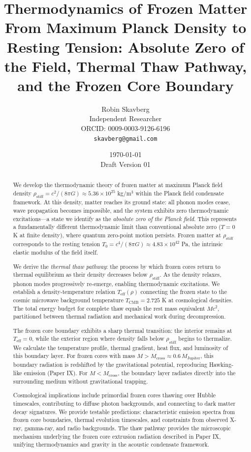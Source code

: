 \documentclass[11pt,a4paper]{article}
\title{\textbf{Thermodynamics of Frozen Matter}\\[0.5em]
\large From Maximum Planck Density to Resting Tension: Absolute Zero of the Field, Thermal Thaw Pathway, and the Frozen Core Boundary}
\author{Robin Skavberg\\[0.3em]
\small Independent Researcher\\
\small ORCID: 0009-0003-9126-6196\\
\small \texttt{skavberg@gmail.com}}
\date{\today\\[0.5em]
\small Draft Version 01}
\newcommand{\rhostiff}{\ensuremath{\rho_{\mathrm{stiff}}}}
\newcommand{\Tzero}{\ensuremath{T_0}}
\newcommand{\Teff}{\ensuremath{T_{\mathrm{eff}}}}
\newcommand{\TCMB}{\ensuremath{T_{\mathrm{CMB}}}}
\newcommand{\Mcross}{\ensuremath{M_{\mathrm{cross}}}}
\theoremstyle{definition}
\theoremstyle{remark}
\begin{document}
\maketitle

\begin{abstract}
We develop the thermodynamic theory of frozen matter at maximum Planck field density $\rhostiff = c^2/(8\pi G) \approx 5.36 \times 10^{25}$ kg/m$^3$ within the Planck field condensate framework. At this density, matter reaches its ground state: all phonon modes cease, wave propagation becomes impossible, and the system exhibits zero thermodynamic excitations---a state we identify as the \emph{absolute zero of the Planck field}. This represents a fundamentally different thermodynamic limit than conventional absolute zero ($T = 0$ K at finite density), where quantum zero-point motion persists. Frozen matter at $\rhostiff$ corresponds to the resting tension $\Tzero = c^4/(8\pi G) \approx 4.83 \times 10^{42}$ Pa, the intrinsic elastic modulus of the field itself.

\vspace{0.5em}
\noindent
We derive the \emph{thermal thaw pathway}: the process by which frozen cores return to thermal equilibrium as their density decreases below $\rhostiff$. As the density relaxes, phonon modes progressively re-emerge, enabling thermodynamic excitations. We establish a density-temperature relation $\Teff(\rho)$ connecting the frozen state to the cosmic microwave background temperature $\TCMB = 2.725$ K at cosmological densities. The total energy budget for complete thaw equals the rest mass equivalent $Mc^2$, partitioned between thermal radiation and mechanical work during decompression.

\vspace{0.5em}
\noindent
The frozen core boundary exhibits a sharp thermal transition: the interior remains at $\Teff = 0$, while the exterior region where density falls below $\rhostiff$ begins to thermalize. We calculate the temperature profile, thermal gradient, heat flux, and luminosity of this boundary layer. For frozen cores with mass $M > \Mcross \approx 0.6\, M_{\mathrm{Jupiter}}$, this boundary radiation is redshifted by the gravitational potential, reproducing Hawking-like emission (Paper IX). For $M < \Mcross$, the boundary layer radiates directly into the surrounding medium without gravitational trapping.

\vspace{0.5em}
\noindent
Cosmological implications include primordial frozen cores thawing over Hubble timescales, contributing to diffuse photon backgrounds, and connecting to dark matter decay signatures. We provide testable predictions: characteristic emission spectra from frozen core boundaries, thermal evolution timescales, and constraints from observed X-ray, gamma-ray, and radio backgrounds. The thaw pathway provides the microscopic mechanism underlying the frozen core extrusion radiation described in Paper IX, unifying thermodynamics and gravity in the acoustic condensate framework.


\end{abstract}
\end{document}
